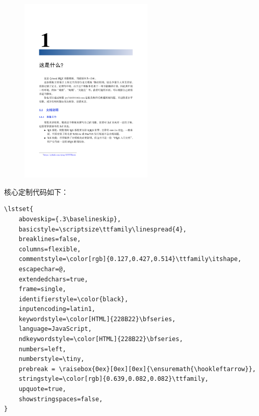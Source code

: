 \documentclass[10pt]{ctexart}
\begin{document}
\begin{figure}[h!]
    \raggedright  %
    \includegraphics[height=9cm]{9.png}  %
    \vspace{-10pt}  %
\end{figure}

\clearpage

核心定制代码如下：
\small
\begin{verbatim}
\lstset{
    aboveskip={.3\baselineskip},
    basicstyle=\scriptsize\ttfamily\linespread{4},
    breaklines=false,
    columns=flexible,
    commentstyle=\color[rgb]{0.127,0.427,0.514}\ttfamily\itshape,
    escapechar=@,
    extendedchars=true,
    frame=single,
    identifierstyle=\color{black},
    inputencoding=latin1,
    keywordstyle=\color[HTML]{228B22}\bfseries,
    language=JavaScript,
    ndkeywordstyle=\color[HTML]{228B22}\bfseries,
    numbers=left,
    numberstyle=\tiny,
    prebreak = \raisebox{0ex}[0ex][0ex]{\ensuremath{\hookleftarrow}},
    stringstyle=\color[rgb]{0.639,0.082,0.082}\ttfamily,
    upquote=true,
    showstringspaces=false,
}
\end{verbatim}

% 
\end{document}
